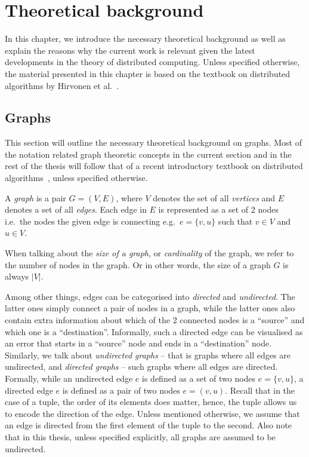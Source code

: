 \chapter{Theoretical background}
\label{chapter:background}

In this chapter, we introduce the necessary theoretical background as well as
explain the reasons why the current work is relevant given the latest
developments in the theory of distributed computing. Unless specified otherwise,
the material presented in this chapter is based on the textbook on distributed algorithms by Hirvonen et al.~\cite{Hirvonen2020}.

\section{Graphs}

This section will outline the necessary theoretical background on graphs. 
Most of the notation related graph theoretic concepts in the current
section and in the rest of the thesis will follow that of
a recent introductory textbook on distributed algorithms~\cite{Hirvonen2020},
unless specified otherwise.

A \emph{graph} is a pair $G = (V, E)$, where $V$ denotes the set of all \emph{vertices}
and $E$ denotes a set of all \emph{edges}. Each edge in $E$ is represented as a set of
2 nodes i.e.\ the nodes the given edge is connecting e.g.\ $e = \{v, u\}$ such that 
$v \in V$ and $u \in V$.

When talking about the \emph{size of a graph}, or \emph{cardinality} of the graph, we refer
to the number of nodes in the graph. Or in other words, the size of a graph $G$
is always $|V|$.

Among other things, edges can be categorised into \emph{directed} and \emph{undirected}.
The latter ones simply connect a pair of nodes in a graph, while the latter
ones also contain extra information about which of the 2 connected nodes is
a ``source'' and which one is a ``destination''. Informally, such a directed edge
can be visualised as an error that starts in a ``source'' node and ends in a 
``destination'' node.  Similarly, we talk about \emph{undirected graphs} -- that is graphs
where all edges are undirected, and \emph{directed graphs} -- such graphs where all
edges are directed. Formally, while an undirected edge $e$ is defined as a
set of two nodes $e = \{v, u\}$, a directed edge $e$ is defined as a pair
of two nodes $e = (v, u)$. Recall that in the case of a tuple, the order of its
elements does matter, hence, the tuple allows us to encode the direction of
the edge. Unless mentioned otherwise, we assume that an edge is directed
from the first element of the tuple to the second. Also note that in this
thesis, unless specified explicitly, all graphs are assumed to be undirected.

